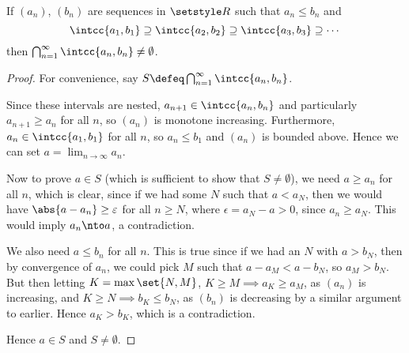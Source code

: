 \documentclass[fleqn,a4paper,11pt]{article}
\begin{document}
 \begin{lemma} \label{lemma_closed_intersection}
  If \((a_n)\), \((b_n)\) are sequences in \(\R\) such that \(a_n \le b_n\) and
  \begin{equation*}
   \intcc{a_1, b_1} \supseteq \intcc{a_2, b_2} \supseteq \intcc{a_3, b_3}
   \supseteq \dotsb
  \end{equation*}
  then \(\bigcap_{n = 1}^\infty \intcc{a_n, b_n} \ne \emptyset\).
 \end{lemma}
 \begin{proof}
  For convenience, say \(S \defeq \bigcap_{n = 1}^\infty \intcc{a_n, b_n}\).

  Since these intervals are nested,
  \(a_{n + 1} \in \intcc{a_n, b_n}\) and particularly \(a_{n + 1} \ge a_n\) for
  all \(n\), so \((a_n)\) is monotone increasing. Furthermore,
  \(a_n \in \intcc{a_1, b_1}\) for all \(n\), so \(a_n \le b_1\) and
  \((a_n)\) is bounded above. Hence we can set
  \(a = \lim_{n \to \infty} a_n\).

  Now to prove \(a \in S\) (which is sufficient to show that
  \(S \ne \emptyset\)), we need \(a \ge a_n\) for all \(n\), which is clear,
  since if we had some \(N\) such that \(a < a_N\), then we would have
  \(\abs{a - a_n} \ge \epsilon\) for all \(n \ge N\), where
  \(\epsilon = a_N - a > 0\), since \(a_n \ge a_N\). This would imply
  \(a_n \nto a\), a contradiction.

  We also need \(a \le b_n\) for all \(n\). This is true since if we had an
  \(N\) with \(a > b_N\), then by convergence of \(a_n\), we could pick
  \(M\) such that \(a - a_M < a - b_N\), so \(a_M > b_N\). But then
  letting \(K = \max\set{N, M}\), \(K \ge M \implies a_K \ge a_M\), as \((a_n)\)
  is increasing, and \(K \ge N \implies b_K \le b_N\), as \((b_n)\) is
  decreasing by a similar argument to earlier. Hence \(a_K > b_K\), which is a
  contradiction.

  Hence \(a \in S\) and \(S \ne \emptyset\).
 \end{proof}
\end{document}

